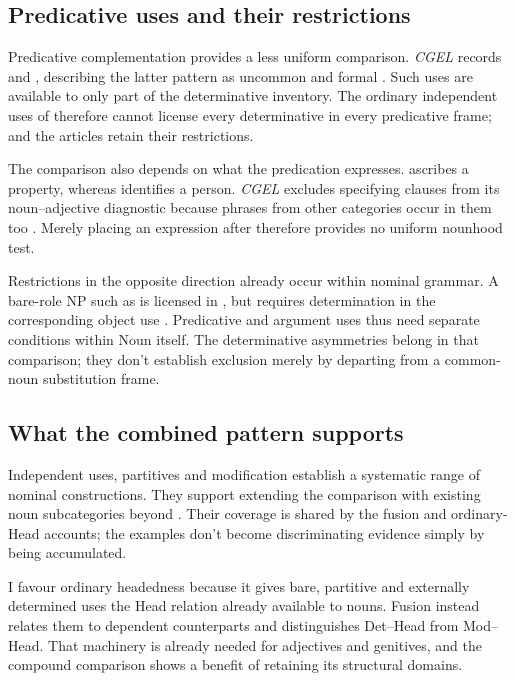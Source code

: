 \documentclass[12pt]{article}
\begin{document}
\subsection{Predicative uses and their restrictions}\label{sec:predication}

Predicative complementation provides a less uniform comparison. \textit{CGEL} records  and , describing the latter pattern as uncommon and formal \citep[392, 395--396]{huddleston2002}. Such uses are available to only part of the determinative inventory. The ordinary independent uses of  therefore cannot license every determinative in every predicative frame;  and the articles retain their restrictions.

The comparison also depends on what the predication expresses.  ascribes a property, whereas  identifies a person. \textit{CGEL} excludes specifying  clauses from its noun--adjective diagnostic because phrases from other categories occur in them too \citep[536]{huddleston2002}. Merely placing an expression after  therefore provides no uniform nounhood test.

Restrictions in the opposite direction already occur within nominal grammar. A bare-role NP such as  is licensed in , but requires determination in the corresponding object use  \citep[328]{huddleston2002}. Predicative and argument uses thus need separate conditions within Noun itself. The determinative asymmetries belong in that comparison; they don't establish exclusion merely by departing from a common-noun substitution frame.

\subsection{What the combined pattern supports}\label{sec:cumulative}

Independent uses, partitives and modification establish a systematic range of nominal constructions. They support extending the comparison with existing noun subcategories beyond . Their coverage is shared by the fusion and ordinary-Head accounts; the examples don't become discriminating evidence simply by being accumulated.

I favour ordinary headedness because it gives bare, partitive and externally determined uses the Head relation already available to nouns. Fusion instead relates them to dependent counterparts and distinguishes Det--Head from Mod--Head. That machinery is already needed for adjectives and genitives, and the compound comparison shows a benefit of retaining its structural domains.
\end{document}
